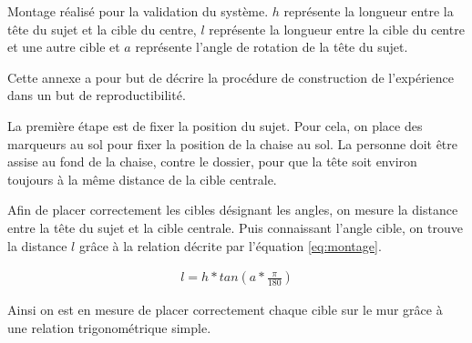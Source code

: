 \documentclass[letterpaper, twoside, 12pt, memoire, creativecommons, hyperref]{thETS}
\begin{document}
\begin{figureap}[ht]
	\centering
	\caption{Montage réalisé pour la validation du système. $h$ représente la longueur entre la tête du sujet et la cible du centre, $l$ représente la longueur entre la cible du centre et une autre cible et $a$ représente l'angle de rotation de la tête du sujet.}
	\label{fig:montageAnnexe}
\end{figureap}

Cette annexe a pour but de décrire la procédure de construction de l'expérience dans un but de reproductibilité. 

La première étape est de fixer la position du sujet. Pour cela, on place des marqueurs au sol pour fixer la position de la chaise au sol. La personne doit être assise au fond de la chaise, contre le dossier, pour que la tête soit environ toujours à la même distance de la cible centrale. 

Afin de placer correctement les cibles désignant les angles, on mesure la distance entre la tête du sujet et la cible centrale. Puis connaissant l'angle cible, on trouve la distance $l$ grâce à la relation décrite par l'équation \ref{eq:montage}.

\begin{align}\label{eq:montage}
   l = h*tan(a*\frac{\pi}{180} )
\end{align}

Ainsi on est en mesure de placer correctement chaque cible sur le mur grâce à une relation trigonométrique simple.

%
\end{document}
